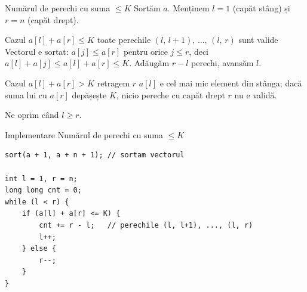 ﻿\documentclass{beamer}
\begin{document}
\begin{frame}{Numărul de perechi cu suma $\leq K$}
  Sortăm $a$. Menținem $l = 1$ (capăt stâng) și $r = n$ (capăt drept).

  \begin{block}{Cazul $a[l]+a[r] \leq K$ \textemdash{} toate perechile $(l,\,l{+}1),\,\ldots,\,(l,\,r)$ sunt valide}
    Vectorul e sortat: $a[j] \leq a[r]$ pentru orice $j \leq r$, deci
    $a[l]+a[j] \leq a[l]+a[r] \leq K$.
    Adăugăm $r-l$ perechi, avansăm $l$.
  \end{block}

  \begin{block}{Cazul $a[l]+a[r] > K$ \textemdash{} retragem $r$}
    $a[l]$ e cel mai mic element din stânga; dacă suma lui cu $a[r]$
    depășește $K$, nicio pereche cu capăt drept $r$ nu e validă.
  \end{block}

  Ne oprim când $l \geq r$.
\end{frame}

\begin{frame}[fragile]{Implementare \textemdash{} Numărul de perechi cu suma $\leq K$}
  \begin{lstlisting}
sort(a + 1, a + n + 1); // sortam vectorul

int l = 1, r = n;
long long cnt = 0;
while (l < r) {
    if (a[l] + a[r] <= K) {
        cnt += r - l;   // perechile (l, l+1), ..., (l, r)
        l++;
    } else {
        r--;
    }
}
  \end{lstlisting}
\end{frame}
\end{document}
